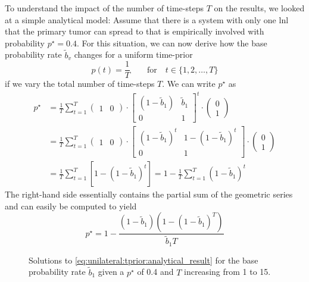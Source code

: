 \documentclass[\relativeRoot/main.tex]{subfiles}
\begin{document}
To understand the impact of the number of time-steps $T$ on the results, we looked at a simple analytical model: Assume that there is a system with only one \gls{lnl} that the primary tumor can spread to that is empirically involved with probability $p^{\star} = 0.4$. For this situation, we can now derive how the base probability rate $\tilde{b}_v$ changes for a uniform time-prior
%
\begin{equation}
    p(t) = \frac{1}{T} \qquad \text{for} \quad t \in \{ 1, 2, \ldots, T \}
\end{equation}
%
if we vary the total number of time-steps $T$. We can write $p^{\star}$ as
%
\begin{equation}
    \begin{aligned}
        p^{\star} &= \frac{1}{T} \sum_{t=1}^T{
            \begin{pmatrix}
                1 & 0
            \end{pmatrix}
            \cdot
            \begin{bmatrix}
                (1 - \tilde{b}_1) & \tilde{b}_1 \\
                0 & 1
            \end{bmatrix}^t
            \cdot
            \begin{pmatrix}
                0 \\
                1
            \end{pmatrix}
        } \\
        &= \frac{1}{T} \sum_{t=1}^T{
            \begin{pmatrix}
                1 & 0
            \end{pmatrix}
            \cdot
            \begin{bmatrix}
                (1 - \tilde{b}_1)^t & 1 - (1 - \tilde{b}_1)^t \\
                0 & 1
            \end{bmatrix}
            \cdot
            \begin{pmatrix}
                0 \\
                1
            \end{pmatrix}
        } \\
        &= \frac{1}{T} \sum_{t=1}^T{ \left[ 1 - (1 - \tilde{b}_1)^t \right] }
        = 1 - \frac{1}{T} \sum_{t=1}^T{(1 - \tilde{b}_1)^t}
    \end{aligned}
\end{equation}
%
The right-hand side essentially contains the partial sum of the geometric series and can easily be computed to yield
%
\begin{equation} \label{eq:unilateral:tprior:analytical_result}
    p^{\star} = 1 - \frac{\left(1 - \tilde{b}_1\right) \left( 1 - (1 - \tilde{b}_1)^T \right)}{\tilde{b}_1 T}
\end{equation}
%
\begin{figure}
    \centering
    \def\svgwidth{0.7\textwidth}
    
    \caption{Solutions to \cref{eq:unilateral:tprior:analytical_result} for the base probability rate $\tilde{b}_1$ given a $p^{\star}$ of 0.4 and $T$ increasing from 1 to 15.}
    \label{fig:unilateral:tprior:rate_decay_analytic}
\end{figure}
\end{document}
